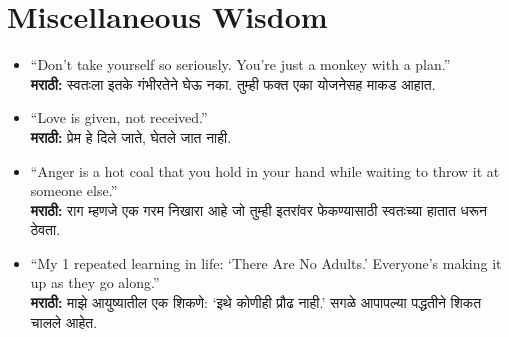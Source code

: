 \section*{Miscellaneous Wisdom}
\begin{itemize}
    \item ``Don’t take yourself so seriously. You’re just a monkey with a plan.'' \\
    \textbf{मराठी:} स्वतःला इतके गंभीरतेने घेऊ नका. तुम्ही फक्त एका योजनेसह माकड आहात.

    \item ``Love is given, not received.'' \\
    \textbf{मराठी:} प्रेम हे दिले जाते, घेतले जात नाही.

    \item ``Anger is a hot coal that you hold in your hand while waiting to throw it at someone else.'' \\
    \textbf{मराठी:} राग म्हणजे एक गरम निखारा आहे जो तुम्ही इतरांवर फेकण्यासाठी स्वतःच्या हातात धरून ठेवता.

    \item ``My 1 repeated learning in life: ‘There Are No Adults.’ Everyone’s making it up as they go along.'' \\
    \textbf{मराठी:} माझे आयुष्यातील एक शिकणे: ‘इथे कोणीही प्रौढ नाही.’ सगळे आपापल्या पद्धतीने शिकत चालले आहेत.
\end{itemize}


